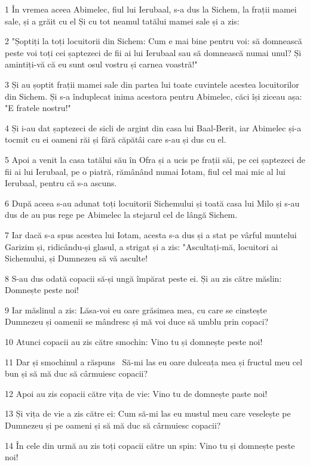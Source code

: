 \par 1 În vremea aceea Abimelec, fiul lui Ierubaal, s-a dus la Sichem, la frații mamei sale, și a grăit cu el Și cu tot neamul tatălui mamei sale și a zis:
\par 2 "Șoptiți la toți locuitorii din Sichem: Cum e mai bine pentru voi: să domnească peste voi toți cei șaptezeci de fii ai lui Ierubaal sau să domnească numai unul? Și amintiți-vă că eu sunt osul vostru și carnea voastră!"
\par 3 Și au șoptit frații mamei sale din partea lui toate cuvintele acestea locuitorilor din Sichem. Și s-a înduplecat inima acestora pentru Abimelec, căci își ziceau așa: "E fratele nostru!"
\par 4 Și i-au dat șaptezeci de sicli de argint din casa lui Baal-Berit, iar Abimelec și-a tocmit cu ei oameni răi și fără căpătâi care s-au și dus cu el.
\par 5 Apoi a venit la casa tatălui său în Ofra și a ucis pe frații săi, pe cei șaptezeci de fii ai lui Ierubaal, pe o piatră, rămânând numai Iotam, fiul cel mai mic al lui Ierubaal, pentru că s-a ascuns.
\par 6 După aceea s-au adunat toți locuitorii Sichemului și toată casa lui Milo și s-au dus de au pus rege pe Abimelec la stejarul cel de lângă Sichem.
\par 7 Iar dacă s-a spus acestea lui Iotam, acesta s-a dus și a stat pe vârful muntelui Garizim și, ridicându-și glasul, a strigat și a zis: "Ascultați-mă, locuitori ai Sichemului, și Dumnezeu să vă asculte!
\par 8 S-au dus odată copacii să-și ungă împărat peste ei. Și au zis către măslin: Domnește peste noi!
\par 9 Iar măslinul a zis: Lăsa-voi eu oare grăsimea mea, cu care se cinstește Dumnezeu și oamenii se mândresc și mă voi duce să umblu prin copaci?
\par 10 Atunci copacii au zis către smochin: Vino tu și domnește peste noi!
\par 11 Dar și smochinul a răspuns  Să-mi las eu oare dulceața mea și fructul meu cel bun și să mă duc să cârmuiesc copacii?
\par 12 Apoi au zis copacii către vița de vie: Vino tu de domnește paste noi!
\par 13 Și vița de vie a zis către ei: Cum să-mi las eu mustul meu care veselește pe Dumnezeu și pe oameni și să mă duc să cârmuiesc copacii?
\par 14 În cele din urmă au zis toți copacii către un spin: Vino tu și domnește peste noi!
